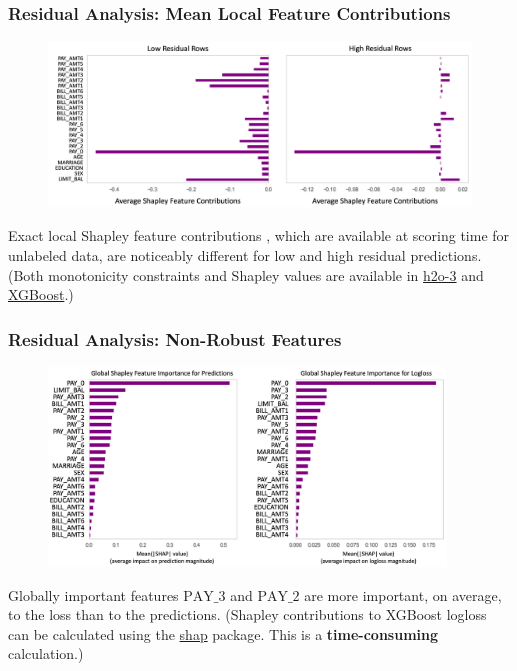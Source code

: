 \documentclass[11pt,
               aspectratio=43,
               hyperref={colorlinks}
               ]{beamer}
\begin{document}
			\begin{frame}[t]
		
				\frametitle{\textbf{Residual Analysis}: Mean Local Feature Contributions}
				\vspace{-15pt}
				\begin{figure}
					\begin{center}
						\includegraphics[height=125pt]{img/global_high_low.png}
					\end{center}
				\end{figure}	
				\scriptsize{Exact local Shapley feature contributions \cite{shapley}, which are available at scoring time for unlabeled data, are noticeably different for low and high residual predictions. (Both monotonicity constraints and Shapley values are available in \href{https://www.github.com/h2oai/h2o-3}{h2o-3} and \href{https://www.github.com/dmlc/xgboost}{XGBoost}.)} 
		
			\end{frame}

			\begin{frame}[t]
		
				\frametitle{\large{\textbf{Residual Analysis}: Non-Robust Features}}
				\vspace{-10pt}
				\begin{figure}
					\begin{center}
						\includegraphics[height=150pt]{img/global_pred_loss.png}
					\end{center}
				\end{figure}
				\vspace{-8pt}	
				\scriptsize{Globally important features $\text{PAY\_3}$ and $\text{PAY\_2}$ are more important, on average, to the loss than to the predictions. (Shapley contributions to XGBoost logloss can be calculated using the \href{https://github.com/slundberg/shap}{shap} package. This is a \textbf{time-consuming} calculation.)} 
		
			\end{frame}
\end{document}

